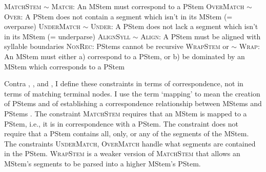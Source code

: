 \begin{exe}
	\ex 
	\begin{xlist}
		\ex \textsc{MatchStem} $\sim$ \textsc{Match}: An MStem must correspond to a PStem\label{nlttPaperconstraint: pstem match redpapertgdfsnd}
		\ex \textsc{OverMatch} $\sim$ \textsc{Over}: A PStem does not contain a segment which isn't in its MStem (= overparse)\label{nlttPaperconstraint: pstem overmatch redpapertgdfsnd}
		\ex \textsc{UnderMatch} $\sim$ \textsc{Under}: A PStem does not lack a segment which isn't in its MStem (= underparse)\label{nlttPaperconstraint: pstem undermatch redpapertgdfsnd}
		\ex \textsc{AlignSyll} $\sim$ \textsc{Align}: A PStem must be aligned with syllable boundaries \label{nlttPaperconstraint: pstem alignsyll redpapertgdfsnd}
		\ex \textsc{NonRec}: PStems cannot be recursive\label{nlttPaperconstraint: pstem nonrec redpapertgdfsnd}
		\ex \textsc{WrapStem} or $\sim$ \textsc{Wrap}: An MStem must either a) correspond to a PStem, or b) be dominated by an MStem which corresponds to a PStem\label{nlttPaperconstraint: pstem wrapstem redpapertgdfsnd}
		
		
	\end{xlist}
\end{exe}

Contra \citet{Selkirk-2011-SyntaxPhonoInterface}, \citet{Elfner-2015-RecursionProsodicPhrasingIrish}, and \citet{Truckenbrodt-1999-RelationSyntaxPhonologyWRAP}, I define these constraints in terms of correspondence, not in terms of matching terminal nodes. I use the term `mapping' to mean the creation of PStems and of establishing a correspondence relationship between MStems and PStems \citep[cf. correspondence relations in ][]{MccarthyPrince-1995-Reduplication,itoMester-2019-matchSyntaxProsodyMaxDepProsodicEnclisisEnglish}. The constraint \textsc{MatchStem} requires that an MStem is mapped to a PStem, i.e., it is in correspondence with a PStem. The constraint does not require that a PStem contains all, only, or any of the segments of the MStem. The constraints \textsc{UnderMatch}, \textsc{OverMatch} handle what segments are contained in the PStem. \textsc{WrapStem} is a weaker version of \textsc{MatchStem} that allows an MStem's segments to be parsed into a higher MStem's PStem.%

